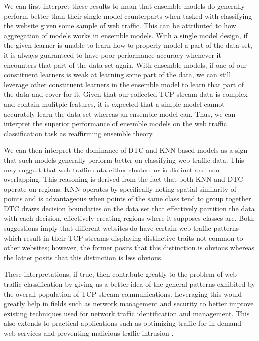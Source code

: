 \documentclass[10pt,sigconf,letterpaper,nonacm]{acmart}
\begin{document}
We can first interpret these results to mean that ensemble models do generally perform better than their single model counterparts when tasked with classifying the website given some sample of web traffic.
This can be attributed to how aggregation of models works in ensemble models.
With a single model design, if the given learner is unable to learn how to properly model a part of the data set, it is always guaranteed to have poor performance accuracy whenever it encounters that part of the data set again.
With ensemble models, if one of our constituent learners is weak at learning some part of the data, we can still leverage other constituent learners in the ensemble model to learn that part of the data and cover for it.
Given that our collected TCP stream data is complex and contain mulitple features, it is expected that a simple model cannot accurately learn the data set whereas an ensemble model can.
Thus, we can interpret the superior performance of ensemble models on the web traffic classification task as reaffirming ensemble theory.

We can then interpret the dominance of DTC and KNN-based models as a sign that such models generally perform better on classifying web traffic data.
This may suggest that web traffic data either clusters or is distinct and non-overlapping.
This reasoning is derived from the fact that both KNN and DTC operate on regions.
KNN operates by specifically noting spatial similarity of points and is advantageous when points of the same class tend to group together.
DTC draws decision boundaries on the data set that effectively partition the data with each decision, effectively creating regions where it supposes classes are.
Both suggestions imply that different websites do have certain web traffic patterns which result in their TCP streams displaying distinctive traits not common to other websites; however, the former posits that this distinction is obvious whereas the latter posits that this distinction is less obvious.

These interpretations, if true, then contribute greatly to the problem of web traffic classification by giving us a better idea of the general patterns exhibited by the overall population of TCP stream communications.
Leveraging this would greatly help in fields such as network management and security to better improve existing techniques used for network traffic identification and management. This also extends to practical applications such as optimizing traffic for in-demand web services and preventing malicious traffic intrusion \cite{traffic}.
\end{document}
